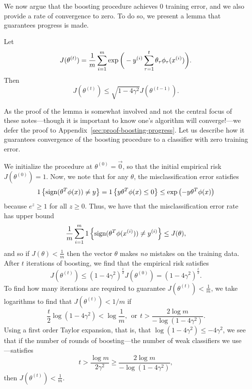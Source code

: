 \documentclass{article}
\newcommand{\represent}{\phi}
\begin{document}
We now argue that the boosting procedure achieves 0 training error,
and we also provide a rate of convergence to zero.
To do so, we present a lemma that guarantees progress is made.
\begin{lemma}
  \label{lemma:boosting-progress}
  Let
  \begin{equation*}
    J(\theta^{(t)})
    = \frac{1}{m} \sum_{i = 1}^m \exp\bigg(-\ysi \sum_{\tau = 1}^t
    \theta_\tau \represent_\tau(\xsi)\bigg).
  \end{equation*}
  Then
  \begin{equation*}
    J(\theta^{(t)})
    \le \sqrt{1 - 4 \gamma^2} J(\theta^{(t - 1)}).
  \end{equation*}
\end{lemma}
\noindent
As the proof of the lemma is somewhat involved and not the central focus of
these notes---though it is important to know one's algorithm will
converge!---we defer the proof to
Appendix~\ref{sec:proof-boosting-progress}.
Let us describe how it guarantees convergence of the
boosting procedure to a classifier with zero training error.


We initialize the procedure at $\theta^{(0)} = \vec{0}$,
so that the initial empirical risk $J(\theta^{(0)}) = 1$. Now, we note
that for any $\theta$, the misclassification error satisfies
\begin{equation*}
  \indic{\sign(\theta^T \represent(x)) \neq y}
  = \indic{y \theta^T \represent(x) \le 0}
  \le \exp\left(-y \theta^T \represent(x)\right)
\end{equation*}
because $e^z \ge 1$ for all $z \ge 0$. Thus, we have that the
misclassification error rate has upper bound
\begin{equation*}
  \frac{1}{m} \sum_{i = 1}^m \indic{\sign(\theta^T \represent(\xsi)) \neq \ysi}
  \le J(\theta),
\end{equation*}
and so if $J(\theta) < \frac{1}{m}$ then the vector $\theta$ makes \emph{no}
mistakes on the training data.
After $t$ iterations of boosting, we find that the empirical risk satisfies
\begin{equation*}
  J(\theta^{(t)})
  \le (1 - 4 \gamma^2)^\frac{t}{2} J(\theta^{(0)})
  = (1 - 4 \gamma^2)^\frac{t}{2}.
\end{equation*}
To find how many iterations are required to guarantee
$J(\theta^{(t)}) < \frac{1}{m}$, we take logarithms to
find that $J(\theta^{(t)}) < 1/m$ if
\begin{equation*}
  \frac{t}{2} \log(1 - 4 \gamma^2) < \log \frac{1}{m},
  ~~ \mbox{or} ~~
  t > \frac{2 \log m}{-\log(1 - 4 \gamma^2)}.
\end{equation*}
Using a first order Taylor expansion, that is, that
$\log(1 - 4 \gamma^2) \le -4\gamma^2$, we see that if the number
of rounds of boosting---the number of weak classifiers we use---satisfies
\begin{equation*}
  t > \frac{\log m}{2 \gamma^2}
  \ge \frac{2 \log m}{-\log(1 - 4 \gamma^2)},
\end{equation*}
then $J(\theta^{(t)}) < \frac{1}{m}$.
\end{document}

